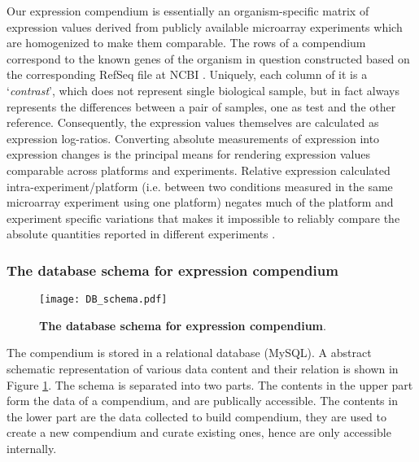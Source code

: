 Our expression compendium is essentially an organism-specific matrix of
expression values derived from publicly available microarray experiments which
are homogenized to make them comparable.
%
The rows of a compendium correspond to the known genes of the organism in
question constructed based on the corresponding RefSeq file at NCBI
\cite{Pruitt2007}.
%
Uniquely, each column of it is a `\textit{contrast}', which does not represent
single biological sample, but in fact always represents the differences between
a pair of samples, one as test and the other reference.
%
Consequently, the expression values themselves are calculated as expression
log-ratios.
%
Converting absolute measurements of expression into expression changes is the
principal means for rendering expression values comparable across platforms and
experiments.
%
Relative expression calculated intra-experiment/platform (i.e. between two
conditions measured in the same microarray experiment using one platform)
negates much of the platform and experiment specific variations that makes it
impossible to reliably compare the absolute quantities reported in different
experiments \cite{Shi2006}.


\subsubsection{The database schema for expression compendium}\label{sec:command-db-schema}

\begin{figure}
  \centering
  \texttt{[image: DB\_schema.pdf]}
  \caption[The database schema for expression compendium]{ \textbf{The
      database schema for expression compendium}.
  }
  \label{fig:comp-db-schema}
\end{figure}

The compendium is stored in a relational database (MySQL). A abstract schematic
representation of various data content and their relation is shown in Figure
\ref{fig:comp-db-schema}.
%
The schema is separated into two parts. The contents in the upper part form the
data of a compendium, and are publically accessible.
%
The contents in the lower part are the data collected to build compendium, they
are used to create a new compendium and curate existing ones, hence are only
accessible internally.

